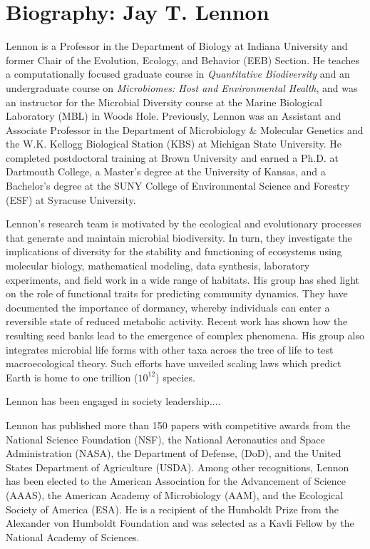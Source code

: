 \documentclass[11pt]{article}
\begin{document}
\section*{Biography: Jay T. Lennon}

Lennon is a Professor in the Department of Biology at Indiana University and former Chair of the Evolution, Ecology, and Behavior (EEB) Section. He teaches a computationally focused graduate course in \textit{Quantitative Biodiversity} and an undergraduate course on \textit{Microbiomes: Host and Environmental Health}, and was an instructor for the Microbial Diversity course at the Marine Biological Laboratory (MBL) in Woods Hole. Previously, Lennon was an Assistant and Associate Professor in the Department of Microbiology \& Molecular Genetics and the W.K. Kellogg Biological Station (KBS) at Michigan State University. He completed postdoctoral training at Brown University and earned a Ph.D. at Dartmouth College, a Master’s degree at the University of Kansas, and a Bachelor’s degree at the SUNY College of Environmental Science and Forestry (ESF) at Syracuse University.

Lennon’s research team is motivated by the ecological and evolutionary processes that generate and maintain microbial biodiversity. In turn, they investigate the implications of diversity for the stability and functioning of ecosystems using molecular biology, mathematical modeling, data synthesis, laboratory experiments, and field work in a wide range of habitats. His group has shed light on the role of functional traits for predicting community dynamics. They have documented the importance of dormancy, whereby individuals can enter a reversible state of reduced metabolic activity. Recent work has shown how the resulting seed banks lead to the emergence of complex phenomena. His group also integrates microbial life forms with other taxa across the tree of life to test macroecological theory. Such efforts have unveiled scaling laws which predict Earth is home to one trillion ($10^{12}$) species.

Lennon has been engaged in society leadership....

Lennon has published more than 150 papers with competitive awards from the National Science Foundation (NSF), the National Aeronautics and Space Administration (NASA), the Department of Defense, (DoD), and the United States Department of Agriculture (USDA). Among other recognitions, Lennon has been elected to the American Association for the Advancement of Science (AAAS), the American Academy of Microbiology (AAM), and the Ecological Society of America (ESA). He is a recipient of the Humboldt Prize from the Alexander von Humboldt Foundation and was selected as a Kavli Fellow by the National Academy of Sciences. 
\end{document}
